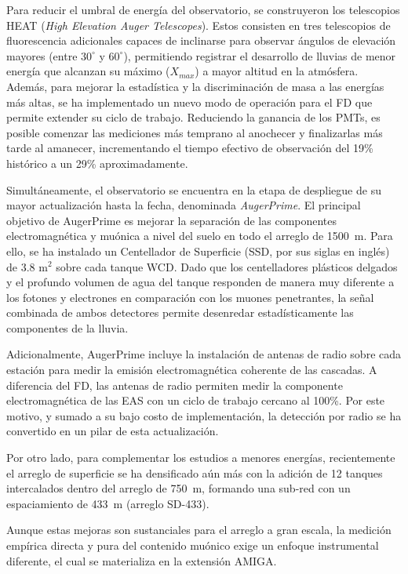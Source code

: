 Para reducir el umbral de energía del observatorio, se construyeron los telescopios HEAT (\textit{High Elevation Auger Telescopes}). Estos consisten en tres telescopios de fluorescencia adicionales capaces de inclinarse para observar ángulos de elevación mayores (entre $30^\circ$ y $60^\circ$), permitiendo registrar el desarrollo de lluvias de menor energía que alcanzan su máximo ($X_{max}$) a mayor altitud en la atmósfera. Además, para mejorar la estadística y la discriminación de masa a las energías más altas, se ha implementado un nuevo modo de operación para el FD que permite extender su ciclo de trabajo. Reduciendo la ganancia de los PMTs, es posible comenzar las mediciones más temprano al anochecer y finalizarlas más tarde al amanecer, incrementando el tiempo efectivo de observación del 19\% histórico a un 29\% aproximadamente.

Simultáneamente, el observatorio se encuentra en la etapa de despliegue de su mayor actualización hasta la fecha, denominada \textit{AugerPrime}. El principal objetivo de AugerPrime es mejorar la separación de las componentes electromagnética y muónica a nivel del suelo en todo el arreglo de 1500~m. Para ello, se ha instalado un Centellador de Superficie (SSD, por sus siglas en inglés) de $3.8\text{ m}^2$ sobre cada tanque WCD. Dado que los centelladores plásticos delgados y el profundo volumen de agua del tanque responden de manera muy diferente a los fotones y electrones en comparación con los muones penetrantes, la señal combinada de ambos detectores permite desenredar estadísticamente las componentes de la lluvia. 

Adicionalmente, AugerPrime incluye la instalación de antenas de radio sobre cada estación para medir la emisión electromagnética coherente de las cascadas. A diferencia del FD, las antenas de radio permiten medir la componente electromagnética de las EAS con un ciclo de trabajo cercano al 100\%. Por este motivo, y sumado a su bajo costo de implementación, la detección por radio se ha convertido en un pilar de esta actualización.

Por otro lado, para complementar los estudios a menores energías, recientemente el arreglo de superficie se ha densificado aún más con la adición de 12 tanques intercalados dentro del arreglo de 750~m, formando una sub-red con un espaciamiento de 433~m (arreglo SD-433).

Aunque estas mejoras son sustanciales para el arreglo a gran escala, la medición empírica directa y pura del contenido muónico exige un enfoque instrumental diferente, el cual se materializa en la extensión AMIGA.

